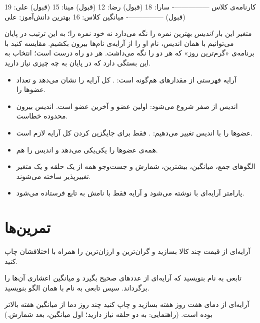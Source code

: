 \begin{outputfa}
کارنامه‌ی کلاس
----------------
سارا: 18 (قبول)
رضا: 12 (قبول)
مینا: 15 (قبول)
علی: 19 (قبول)
----------------
میانگین کلاس: 16
بهترین دانش‌آموز: علی
\end{outputfa}

متغیر  این بار \emph{اندیس} بهترین نمره را نگه می‌دارد نه
خود نمره را؛ به این ترتیب در پایان می‌توانیم با همان اندیس، نام او را از
آرایه‌ی نام‌ها بیرون بکشیم. مقایسه کنید با برنامه‌ی «گرم‌ترین روز» که هر
دو را نگه می‌داشت. هر دو راه درست است؛ انتخاب به این بستگی دارد که در
پایان به چه چیزی نیاز دارید.

\begin{summary}
\begin{itemize}
  \item آرایه فهرستی از مقدارهای هم‌گونه است: .
         کل آرایه را نشان می‌دهد و  تعداد عضوها
        را.
  \item اندیس از صفر شروع می‌شود:  اولین عضو و
         آخرین عضو است. اندیس بیرون محدوده خطاست.
  \item عضوها را با اندیس تغییر می‌دهیم: . 
        فقط برای جایگزین کردن کل آرایه لازم است.
  \item {} همه‌ی عضوها را یکی‌یکی می‌دهد و
         اندیس را هم.
  \item الگوهای جمع، میانگین، بیشترین، شمارش و جست‌وجو همه از یک حلقه و
        یک متغیر تغییرپذیر ساخته می‌شوند.
  \item پارامتر آرایه‌ای با  نوشته می‌شود و آرایه فقط با
        نامش به تابع فرستاده می‌شود.
\end{itemize}
\end{summary}

\section*{تمرین‌ها}

\exercise آرایه‌ای از قیمت چند کالا بسازید و گران‌ترین و ارزان‌ترین را
همراه با اختلافشان چاپ کنید.

\exercise تابعی به نام  بنویسید که آرایه‌ای از عددهای صحیح
بگیرد و میانگین اعشاری آن‌ها را برگرداند. سپس تابعی به نام
 با همان الگو بنویسید.

\exercise آرایه‌ای از دمای هفت روز هفته بسازید و چاپ کنید چند روز دما از
میانگین هفته بالاتر بوده است. (راهنمایی: به دو حلقه نیاز دارید؛ اول
میانگین، بعد شمارش.)


